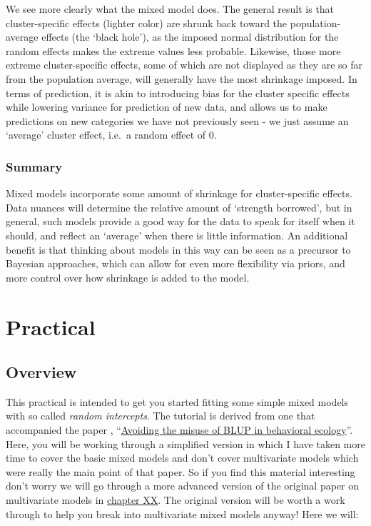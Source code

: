 \documentclass[
  12pt,
]{book}
\begin{document}
We see more clearly what the mixed model does. The general result is that cluster-specific effects (lighter color) are shrunk back toward the population-average effects (the `black hole'), as the imposed normal distribution for the random effects makes the extreme values less probable. Likewise, those more extreme cluster-specific effects, some of which are not displayed as they are so far from the population average, will generally have the most shrinkage imposed. In terms of prediction, it is akin to introducing bias for the cluster specific effects while lowering variance for prediction of new data, and allows us to make predictions on new categories we have not previously seen - we just assume an `average' cluster effect, i.e.~a random effect of 0.

\hypertarget{summary}{%
\subsubsection{Summary}\label{summary}}

Mixed models incorporate some amount of shrinkage for cluster-specific effects. Data nuances will determine the relative amount of `strength borrowed', but in general, such models provide a good way for the data to speak for itself when it should, and reflect an `average' when there is little information. An additional benefit is that thinking about models in this way can be seen as a precursor to Bayesian approaches, which can allow for even more flexibility via priors, and more control over how shrinkage is added to the model.

\hypertarget{practical-3}{%
\section{Practical}\label{practical-3}}

\hypertarget{overview}{%
\subsection{Overview}\label{overview}}

This practical is intended to get you started fitting some simple mixed models with so called \emph{random intercepts}. The tutorial is derived from one that accompanied the paper \citep{houslay_avoiding_2017}, ``\href{https://doi.org/10.1093/beheco/arx023}{Avoiding the misuse of BLUP in behavioral ecology}''. Here, you will be working through a simplified version in which I have taken more time to cover the basic mixed models and don't cover multivariate models which were really the main point of that paper. So if you find this material interesting don't worry we will go through a more advanced version of the original paper on multivariate models in \protect\hyperlink{to_be_written}{chapter XX}. The original version will be worth a work through to help you break into multivariate mixed models anyway! Here we will:
\end{document}
